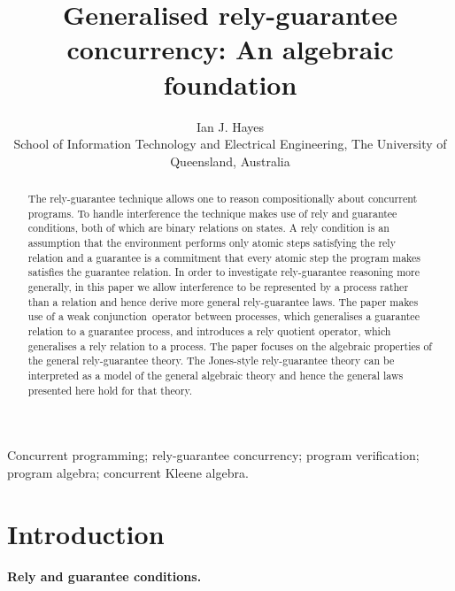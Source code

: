 \documentclass[fleqn]{fac}
\newcommand{\draftonly}[1]{}
\newcommand{\strictconjunction}{weak conjunction}
\edef\today{\number\day\ \ifcase\month\or
  January\or February\or March\or April\or May\or June\or
  July\or August\or September\or October\or November\or December\fi
  \ \number\year}
\newcommand{\runningdate}{\draftonly{(\today\ DRAFT)}}
\begin{document}
\newcommand{\Reviewers}[1]{}


\title[Generalised rely-guarantee concurrency \runningdate]{Generalised rely-guarantee concurrency: An algebraic foundation}
\author[Ian J. Hayes \runningdate]{Ian J. Hayes \\
School of Information Technology and Electrical Engineering, The University of Queensland, Australia
}\makecorrespond 

\maketitle 

\begin{abstract}
The rely-guarantee technique allows one to reason compositionally about concurrent programs.
To handle interference the technique makes use of rely and guarantee conditions,
both of which are binary relations on states.
A rely condition is an assumption that the environment performs
only atomic steps satisfying the rely relation
and a guarantee is a commitment that every atomic step 
the program makes satisfies the guarantee relation.
In order to investigate rely-guarantee reasoning more generally,
in this paper we allow interference to be represented by a 
process rather than a relation
and hence derive more general rely-guarantee laws.
The paper makes use of a \strictconjunction\ operator between processes,
which generalises a guarantee relation to a guarantee process,
and introduces a rely quotient operator, 
which generalises a rely relation to a process.
The paper focuses on the algebraic properties of the general 
rely-guarantee theory.
The Jones-style rely-guarantee theory can be interpreted  
as a model of the general algebraic theory
and hence the general laws presented here hold for that theory. 
\end{abstract}

\begin{keywords}
Concurrent programming; 
rely-guarantee concurrency; 
program verification;
program algebra;
concurrent Kleene algebra.
\end{keywords}





\section{Introduction}

\paragraph{Rely and guarantee conditions.}
\end{document}
